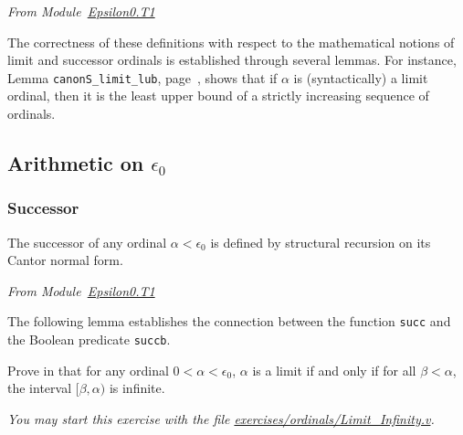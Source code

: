 \vspace{4pt}
\noindent
\emph{From Module~\href{../theories/html/hydras.Epsilon0.T1.html\#succb}{Epsilon0.T1}}






The correctness of these definitions with respect to the mathematical notions of
limit and successor ordinals is established through several lemmas. For instance,
Lemma \texttt{canonS\_limit\_lub}, page~\pageref{lemma:canonS-limit}, shows that
if $\alpha$ is (syntactically) a limit ordinal, then it is the least upper bound of
a strictly increasing sequence of ordinals.






\subsection{Arithmetic on \texorpdfstring{$\epsilon_0$}{epsilon0}}
\subsubsection{Successor}


The successor of any ordinal $\alpha< \epsilon_0$ is defined by structural 
recursion on its Cantor normal form.

\label{Functions:succ-T1}

\vspace{4pt}
\emph{From Module~\href{../theories/html/hydras.Epsilon0.T1.html\#succ}{Epsilon0.T1}}




The following lemma establishes the connection between the  function
\texttt{succ} and the Boolean predicate \texttt{succb}.

\vspace{4pt}






 \begin{exercise}
Prove in \coq{} that for any ordinal $0< \alpha<\epsilon_0$, $\alpha$ is a limit if 
and only if for all $\beta<\alpha$, the interval $[\beta,\alpha)$ is
infinite.

\emph{You may start this exercise with the file
     \href{https://github.com/coq-community/hydra-battles/tree/master/exercises/ordinals/Limit_Infinity.v}{exercises/ordinals/Limit\_Infinity.v}.}
 \end{exercise}


